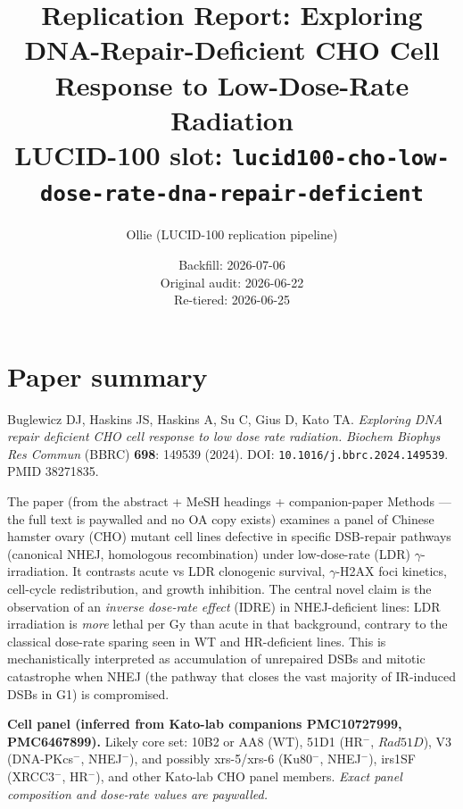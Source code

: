 \documentclass[11pt]{article}
\title{Replication Report: Exploring DNA-Repair-Deficient CHO Cell Response to Low-Dose-Rate Radiation \\
\large LUCID-100 slot: \texttt{lucid100-cho-low-dose-rate-dna-repair-deficient}}
\author{Ollie (LUCID-100 replication pipeline)}
\date{Backfill: 2026-07-06 \\ Original audit: 2026-06-22 \\ Re-tiered: 2026-06-25}
\begin{document}
\maketitle

\begin{center}
\end{center}

\section{Paper summary}

Buglewicz DJ, Haskins JS, Haskins A, Su C, Gius D, Kato TA. \emph{Exploring DNA repair
deficient CHO cell response to low dose rate radiation.} \emph{Biochem Biophys Res Commun}
(BBRC) \textbf{698}: 149539 (2024). DOI: \texttt{10.1016/j.bbrc.2024.149539}. PMID 38271835.

The paper (from the abstract + MeSH headings + companion-paper Methods --- the full text is
paywalled and no OA copy exists) examines a panel of Chinese hamster ovary (CHO) mutant cell
lines defective in specific DSB-repair pathways (canonical NHEJ, homologous recombination) under
low-dose-rate (LDR) $\gamma$-irradiation. It contrasts acute vs LDR clonogenic survival, $\gamma$-H2AX
foci kinetics, cell-cycle redistribution, and growth inhibition. The central novel claim is the
observation of an \emph{inverse dose-rate effect} (IDRE) in NHEJ-deficient lines: LDR
irradiation is \emph{more} lethal per Gy than acute in that background, contrary to the
classical dose-rate sparing seen in WT and HR-deficient lines. This is mechanistically
interpreted as accumulation of unrepaired DSBs and mitotic catastrophe when NHEJ (the pathway
that closes the vast majority of IR-induced DSBs in G1) is compromised.

\textbf{Cell panel (inferred from Kato-lab companions PMC10727999, PMC6467899).} Likely core
set: 10B2 or AA8 (WT), 51D1 (HR$^-$, $Rad51D$), V3 (DNA-PKcs$^-$, NHEJ$^-$), and possibly
xrs-5/xrs-6 (Ku80$^-$, NHEJ$^-$), irs1SF (XRCC3$^-$, HR$^-$), and other Kato-lab CHO panel
members. \emph{Exact panel composition and dose-rate values are paywalled.}
\end{document}
